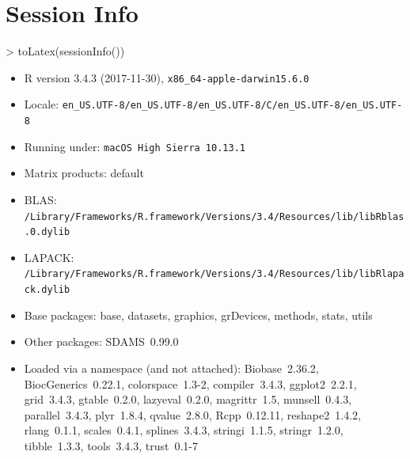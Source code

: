 \documentclass[12pt]{article}
\begin{document}
\section{Session Info}

\begin{Schunk}
\begin{Sinput}
> toLatex(sessionInfo())
\end{Sinput}
\begin{itemize}\raggedright
  \item R version 3.4.3 (2017-11-30), \verb|x86_64-apple-darwin15.6.0|
  \item Locale: \verb|en_US.UTF-8/en_US.UTF-8/en_US.UTF-8/C/en_US.UTF-8/en_US.UTF-8|
  \item Running under: \verb|macOS High Sierra 10.13.1|
  \item Matrix products: default
  \item BLAS: \verb|/Library/Frameworks/R.framework/Versions/3.4/Resources/lib/libRblas.0.dylib|
  \item LAPACK: \verb|/Library/Frameworks/R.framework/Versions/3.4/Resources/lib/libRlapack.dylib|
  \item Base packages: base, datasets, graphics, grDevices, methods,
    stats, utils
  \item Other packages: SDAMS~0.99.0
  \item Loaded via a namespace (and not attached): Biobase~2.36.2,
    BiocGenerics~0.22.1, colorspace~1.3-2, compiler~3.4.3,
    ggplot2~2.2.1, grid~3.4.3, gtable~0.2.0, lazyeval~0.2.0,
    magrittr~1.5, munsell~0.4.3, parallel~3.4.3, plyr~1.8.4,
    qvalue~2.8.0, Rcpp~0.12.11, reshape2~1.4.2, rlang~0.1.1,
    scales~0.4.1, splines~3.4.3, stringi~1.1.5, stringr~1.2.0,
    tibble~1.3.3, tools~3.4.3, trust~0.1-7
\end{itemize}\end{Schunk}



\end{document}
